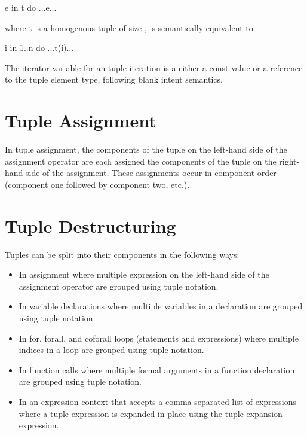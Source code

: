 \begin{chapel}
 e in t do
  ...e...
\end{chapel}

where t is a homogenous tuple of size , is semantically
equivalent to:

\begin{chapel}
 i in 1..n do
  ...t(i)...
\end{chapel}

The iterator variable for an tuple iteration is a either a const value
or a reference to the tuple element type, following blank intent
semantics.

\section{Tuple Assignment}
\label{Tuple_Assignment}

In tuple assignment, the components of the tuple on the left-hand side
of the assignment operator are each assigned the components of the
tuple on the right-hand side of the assignment.  These assignments
occur in component order (component one followed by component two,
etc.).

\section{Tuple Destructuring}
\label{Tuple_Destructuring}

Tuples can be split into their components in the following ways:
\begin{itemize}
\item In assignment where multiple expression on the left-hand side of
the assignment operator are grouped using tuple notation.
\item In variable declarations where multiple variables in a
declaration are grouped using tuple notation.
\item In for, forall, and coforall loops (statements and expressions)
where multiple indices in a loop are grouped using tuple notation.
\item In function calls where multiple formal arguments in a function
declaration are grouped using tuple notation.
\item In an expression context that accepts a comma-separated list of
expressions where a tuple expression is expanded in place using the
tuple expansion expression.
\end{itemize}

